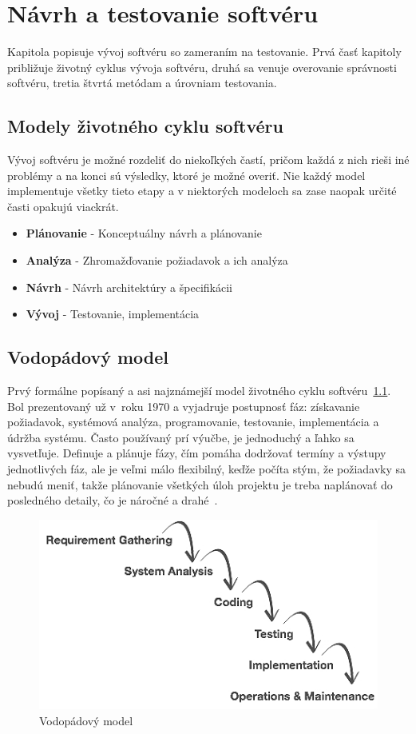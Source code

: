 \chapter{Návrh a testovanie softvéru}
\label{tests_design}
Kapitola popisuje vývoj softvéru so zameraním na testovanie. 
Prvá časť kapitoly približuje životný cyklus vývoja softvéru, druhá sa venuje overovanie správnosti softvéru, tretia štvrtá metódam a úrovniam testovania.

\section{Modely životného cyklu softvéru}
\label{life_cycles}
Vývoj softvéru je možné rozdeliť do niekoľkých častí, pričom každá z nich rieši iné problémy a na konci sú výsledky, ktoré je možné overiť.
Nie každý model implementuje všetky tieto etapy a v niektorých modeloch sa zase naopak určité časti opakujú viackrát.
\begin{itemize}
	\item \textbf{Plánovanie} - Konceptuálny návrh a plánovanie
	\item \textbf{Analýza} - Zhromažďovanie požiadavok a ich analýza
	\item \textbf{Návrh} - Návrh architektúry a špecifikácii
	\item \textbf{Vývoj} - Testovanie, implementácia
\end{itemize}

\section*{Vodopádový model}
\label{waterfall_model}
Prvý formálne popísaný a asi najznámejší model životného cyklu softvéru~\ref{waterfall_model_fig}.
Bol prezentovaný už v~roku 1970 a vyjadruje postupnosť fáz: získavanie požiadavok, systémová analýza, programovanie, testovanie, implementácia a údržba systému.
Často používaný prí výučbe, je jednoduchý a ľahko sa vysvetľuje.
Definuje a plánuje fázy, čím pomáha dodržovať termíny a výstupy jednotlivých fáz, ale je veľmi málo flexibilný, keďže počíta stým, že požiadavky sa nebudú meniť, takže plánovanie všetkých úloh projektu je treba naplánovať do posledného detaily, čo je náročné a drahé~\cite{Patton}.
\begin{figure}[H]
\centering
\includegraphics[width=0.65\linewidth]{obrazky/waterfall_model.png}
\caption{Vodopádový model~\cite{models}}
\label{waterfall_model_fig}
\end{figure}

